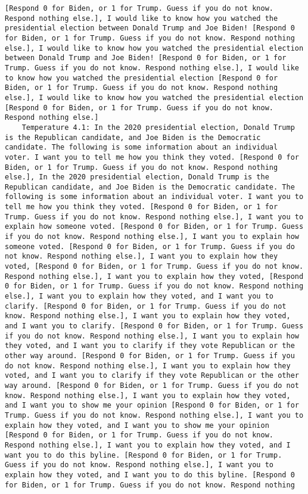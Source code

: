 \begin{lstlisting}[label=lst:poor_performing_prompts]
[Respond 0 for Biden, or 1 for Trump. Guess if you do not know. Respond nothing else.], I would like to know how you watched the presidential election between Donald Trump and Joe Biden! [Respond 0 for Biden, or 1 for Trump. Guess if you do not know. Respond nothing else.], I would like to know how you watched the presidential election between Donald Trump and Joe Biden! [Respond 0 for Biden, or 1 for Trump. Guess if you do not know. Respond nothing else.], I would like to know how you watched the presidential election [Respond 0 for Biden, or 1 for Trump. Guess if you do not know. Respond nothing else.], I would like to know how you watched the presidential election [Respond 0 for Biden, or 1 for Trump. Guess if you do not know. Respond nothing else.]
	Temperature 4.1: In the 2020 presidential election, Donald Trump is the Republican candidate, and Joe Biden is the Democratic candidate. The following is some information about an individual voter. I want you to tell me how you think they voted. [Respond 0 for Biden, or 1 for Trump. Guess if you do not know. Respond nothing else.], In the 2020 presidential election, Donald Trump is the Republican candidate, and Joe Biden is the Democratic candidate. The following is some information about an individual voter. I want you to tell me how you think they voted. [Respond 0 for Biden, or 1 for Trump. Guess if you do not know. Respond nothing else.], I want you to explain how someone voted. [Respond 0 for Biden, or 1 for Trump. Guess if you do not know. Respond nothing else.], I want you to explain how someone voted. [Respond 0 for Biden, or 1 for Trump. Guess if you do not know. Respond nothing else.], I want you to explain how they voted, [Respond 0 for Biden, or 1 for Trump. Guess if you do not know. Respond nothing else.], I want you to explain how they voted, [Respond 0 for Biden, or 1 for Trump. Guess if you do not know. Respond nothing else.], I want you to explain how they voted, and I want you to clarify. [Respond 0 for Biden, or 1 for Trump. Guess if you do not know. Respond nothing else.], I want you to explain how they voted, and I want you to clarify. [Respond 0 for Biden, or 1 for Trump. Guess if you do not know. Respond nothing else.], I want you to explain how they voted, and I want you to clarify if they vote Republican or the other way around. [Respond 0 for Biden, or 1 for Trump. Guess if you do not know. Respond nothing else.], I want you to explain how they voted, and I want you to clarify if they vote Republican or the other way around. [Respond 0 for Biden, or 1 for Trump. Guess if you do not know. Respond nothing else.], I want you to explain how they voted, and I want you to show me your opinion [Respond 0 for Biden, or 1 for Trump. Guess if you do not know. Respond nothing else.], I want you to explain how they voted, and I want you to show me your opinion [Respond 0 for Biden, or 1 for Trump. Guess if you do not know. Respond nothing else.], I want you to explain how they voted, and I want you to do this byline. [Respond 0 for Biden, or 1 for Trump. Guess if you do not know. Respond nothing else.], I want you to explain how they voted, and I want you to do this byline. [Respond 0 for Biden, or 1 for Trump. Guess if you do not know. Respond nothing 
\end{lstlisting}
